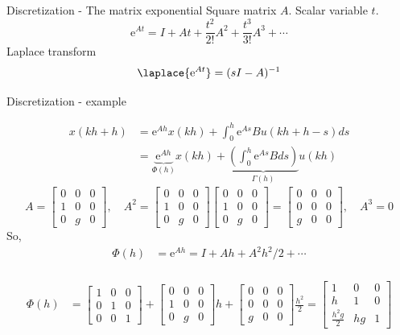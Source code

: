 \documentclass[presentation,aspectratio=1610]{beamer}
\begin{document}
\begin{frame}[label={sec:orgf9cef9f}]{Discretization - The matrix exponential}
Square matrix \(A\). Scalar variable \(t\).
\[ \mathrm{e}^{At} = I + At + \frac{t^2}{2!}A^2 + \frac{t^3}{3!} A^3 + \cdots\]
Laplace transform
\[ \laplace{\mathrm{e}^{At}} = (sI - A)^{-1}\]
\end{frame}


\begin{frame}[label={sec:org03ba997}]{Discretization - example}
\small

 \begin{align*}
  x(kh+h) &= \mathrm{e}^{Ah} x(kh) + \int_{0}^{h} \mathrm{e}^{As} B u(kh+h-s) ds\\
   &= \underbrace{\mathrm{e}^{Ah}}_{\Phi(h)} x(kh) + \underbrace{\left(\int_{0}^h \mathrm{e}^{As} B ds \right)}_{\Gamma(h)} u(kh)
\end{align*}
\[ A = \begin{bmatrix} 0 & 0 & 0\\1 & 0 & 0\\0 & g & 0\end{bmatrix}, \quad A^2 = \begin{bmatrix} 0 & 0 & 0\\1 & 0 & 0\\0 & g & 0\end{bmatrix}\begin{bmatrix} 0 & 0 & 0\\1 & 0 & 0\\0 & g & 0\end{bmatrix}= \begin{bmatrix} 0 & 0 & 0\\0 & 0 & 0\\g & 0  & 0\end{bmatrix}, \quad A^3 = 0\]
So,
\begin{align*}
 \Phi(h) &= \mathrm{e}^{Ah} = I + Ah + A^2 h^2/2  + \cdots \\
\end{align*}

\pause

\begin{align*}
 \Phi(h) &= \begin{bmatrix} 1 & 0 & 0\\0 & 1 & 0\\0 & 0 & 1\end{bmatrix} + \begin{bmatrix} 0 & 0 & 0\\1 & 0 & 0\\0 & g & 0\end{bmatrix}h + \begin{bmatrix} 0 & 0 & 0\\0 & 0 & 0\\g & 0 & 0\end{bmatrix}\frac{h^ 2}{2}= \begin{bmatrix} 1 & 0 & 0\\h & 1 & 0\\\frac{h^2g}{2} & hg & 1\end{bmatrix}
 \end{align*}
\end{frame}
\end{document}
